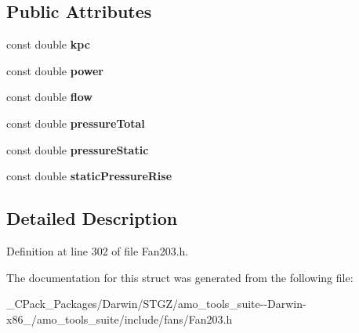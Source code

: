\subsection*{Public Attributes}
\begin{DoxyCompactItemize}
\item 
\mbox{\label{struct_fan203_1_1_results_af7807d80fca26d0b285bc64724955bef}} 
const double {\bfseries kpc}
\item 
\mbox{\label{struct_fan203_1_1_results_a9349844e20eff206f02af8966e2e5fac}} 
const double {\bfseries power}
\item 
\mbox{\label{struct_fan203_1_1_results_ac33d08fec0aca62c54453533afd56138}} 
const double {\bfseries flow}
\item 
\mbox{\label{struct_fan203_1_1_results_a1badf6a2ca70b8a8e5b5a8434bd616cd}} 
const double {\bfseries pressure\+Total}
\item 
\mbox{\label{struct_fan203_1_1_results_aafd803a2134247f32b4da2f6c456e003}} 
const double {\bfseries pressure\+Static}
\item 
\mbox{\label{struct_fan203_1_1_results_a78f134ec5411707138395bfd17e2f34e}} 
const double {\bfseries static\+Pressure\+Rise}
\end{DoxyCompactItemize}


\subsection{Detailed Description}


Definition at line 302 of file Fan203.\+h.



The documentation for this struct was generated from the following file\+:\begin{DoxyCompactItemize}
\item 
\+\_\+\+C\+Pack\+\_\+\+Packages/\+Darwin/\+S\+T\+G\+Z/amo\+\_\+tools\+\_\+suite-\/-\/\+Darwin-\/x86\+\_/amo\+\_\+tools\+\_\+suite/include/fans/Fan203.\+h\end{DoxyCompactItemize}
